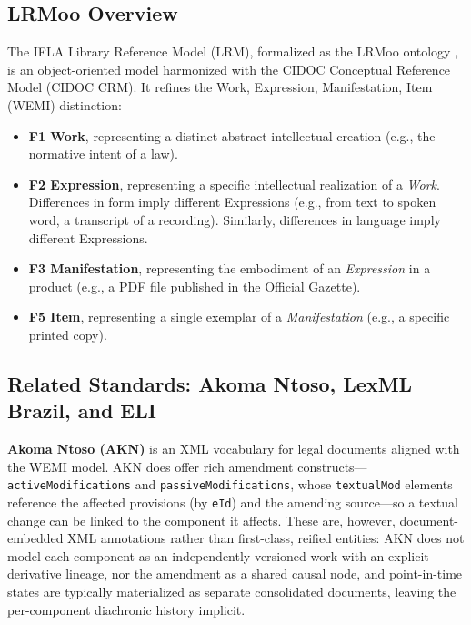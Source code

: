 \documentclass[11pt]{article}
\begin{document}
\subsection{LRMoo Overview}
The IFLA Library Reference Model (LRM), formalized as the LRMoo ontology \cite{lrmoo2024}, is an object-oriented model harmonized with the CIDOC Conceptual Reference Model (CIDOC CRM). It refines the Work, Expression, Manifestation, Item (WEMI) distinction:
\begin{itemize}
\item \textbf{F1 Work}, representing a distinct abstract intellectual creation (e.g., the normative intent of a law).
\item \textbf{F2 Expression}, representing a specific intellectual realization of a \emph{Work}. Differences in form imply different Expressions (e.g., from text to spoken word, a transcript of a recording). Similarly, differences in language imply different Expressions.
\item \textbf{F3 Manifestation}, representing the embodiment of an \emph{Expression} in a product (e.g., a PDF file published in the Official Gazette).
\item \textbf{F5 Item}, representing a single exemplar of a \emph{Manifestation} (e.g., a specific printed copy).
\end{itemize}

\subsection{Related Standards: Akoma Ntoso, LexML Brazil, and ELI}
\textbf{Akoma Ntoso (AKN)} \cite{palmirani2011akoma} is an XML vocabulary for legal documents aligned with the WEMI model. AKN does offer rich amendment constructs---\texttt{activeModifications} and \texttt{passiveModifications}, whose \texttt{textualMod} elements reference the affected provisions (by \texttt{eId}) and the amending source---so a textual change can be linked to the component it affects. These are, however, document-embedded XML annotations rather than first-class, reified entities: AKN does not model each component as an independently versioned work with an explicit derivative lineage, nor the amendment as a shared causal node, and point-in-time states are typically materialized as separate consolidated documents, leaving the per-component diachronic history implicit.
\end{document}
